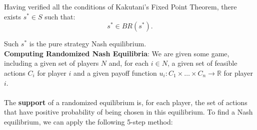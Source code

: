 \documentclass{article}
\begin{document}
Having verified all the conditions of Kakutani’s Fixed Point Theorem, there exists \(s^* \in S\) such that:
\[
    s^* \in BR(s^*).
\]

Such \(s^*\) is the pure strategy Nash equilibrium. \\ 

\noindent \textbf{Computing Randomized Nash Equilibria}: 
We are given some game, including a given set of players \( N \) and, for each \( i \in N \), a given set of feasible actions \( C_i \) for player \( i \) and a given payoff function \( u_i: C_1 \times \dots \times C_n \to \mathbb{R} \) for player \( i \).
\\
\\
\noindent The \textbf{support} of a randomized equilibrium is, for each player, the set of actions that have positive probability of being chosen in this equilibrium. To find a Nash equilibrium, we can apply the following 5-step method:
\end{document}
